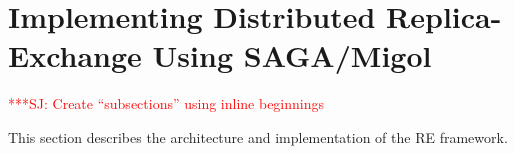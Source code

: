 \documentclass{rspublic}
\newcommand{\alnote}[1]{ {\textcolor{blue} { ***AL: #1 }}}
\newcommand{\jhanote}[1]{ {\textcolor{red} { ***SJ: #1 }}}
\newcommand{\alnote}[1]{}
\newcommand{\jhanote}[1]{}
\begin{document}

                         
\section{Implementing Distributed Replica-Exchange Using SAGA/Migol}
\label{sec:remd_impl}

\jhanote{Create ``subsections'' using inline beginnings}



This section describes the architecture and implementation of the RE
framework. 


  
          
\end{document}
